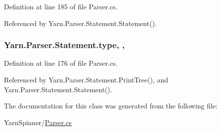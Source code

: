 Definition at line 185 of file Parser.\-cs.



Referenced by Yarn.\-Parser.\-Statement.\-Statement().

\hypertarget{a00168_aa3fa0eb260e412720562ce06b7dc06fe}{
\subsubsection[{type}]{ Yarn.\-Parser.\-Statement.\-type\hspace{0.3cm}{\ttfamily [get]}, {\ttfamily [set]}, {\ttfamily [package]}}}\label{a00168_aa3fa0eb260e412720562ce06b7dc06fe}


Definition at line 176 of file Parser.\-cs.



Referenced by Yarn.\-Parser.\-Statement.\-Print\-Tree(), and Yarn.\-Parser.\-Statement.\-Statement().



The documentation for this class was generated from the following file\-:\begin{DoxyCompactItemize}
\item 
Yarn\-Spinner/\hyperlink{a00316}{Parser.\-cs}\end{DoxyCompactItemize}
